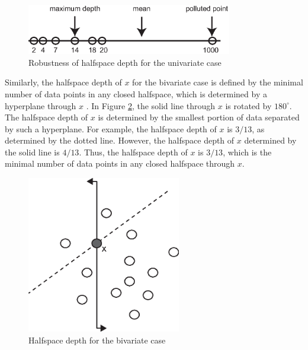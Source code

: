 \documentclass[a4paper,UKenglish]{lipics-v2018}
\begin{document}
\begin{figure}
	\centering
	\includegraphics[width=0.8\textwidth]{images/depth_uni.eps}
	\caption{Robustness of halfspace depth for the univariate case}
	\label{fig:hd_uni}	
\end{figure}


Similarly, the halfspace depth of $x$ for the bivariate case is defined by the minimal number of data points in any closed halfspace, which is determined by a hyperplane through $x$ \cite{rousseeuw96RSS}. In Figure \ref{fig:hd_bi}, the solid line through $x$ is rotated by $180^{\circ}$. The halfspace depth of $x$ is determined by the smallest portion of data separated by such a hyperplane. For example, the halfspace depth of $x$ is $3/13$, as determined by the dotted line. However, the halfspace depth of $x$ determined by the solid line is  $4/13$. Thus, the halfspace depth of $x$ is $3/13$, which is the minimal number of data points in any closed halfspace through $x$.
 
\begin{figure}
	\centering
	\includegraphics[width=0.6\textwidth]{images/depth_bi.eps}
	\caption{Halfspace depth for the bivariate case}
	\label{fig:hd_bi}	
\end{figure}
\end{document}

